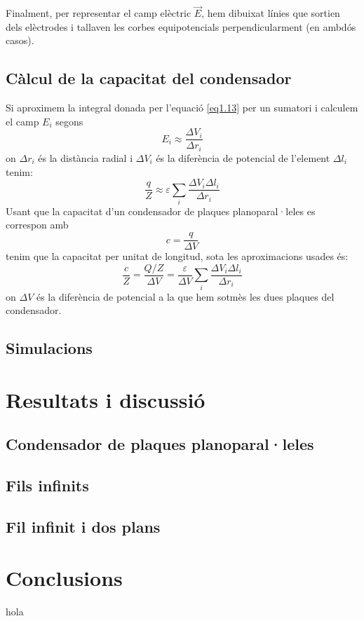 \documentclass[a4paper,10.5pt]{report}
\begin{document}
	Finalment, per representar el camp elèctric $\vec{E}$, hem dibuixat línies que sortien dels elèctrodes i tallaven les corbes equipotencials perpendicularment (en ambdós casos). 
	
	\subsection{Càlcul de la capacitat del condensador}
	Si aproximem la integral donada per l'equació \eqref{eq1.13} per un sumatori i calculem el camp $E_i$ segons
	\begin{equation}
		E_i \approx \frac{\Delta V_i}{\Delta r_i}
	\end{equation}
	on $\Delta r_i$ és la distància radial i $\Delta V_i$ és la diferència de potencial de l'element $\Delta l_i$ tenim:
	\begin{equation}
		\frac{q}{Z} \approx \varepsilon \sum_i \frac{\Delta V_i \Delta l_i}{\Delta r_i}
	\end{equation}
	Usant que la capacitat d'un condensador de plaques planoparal·leles es correspon amb 
	\begin{equation}
		c = \frac{q}{\Delta V}
	\end{equation}
	tenim que la capacitat per unitat de longitud, sota les aproximacions usades és:
	\begin{equation}
		\frac{c}{Z} = \frac{Q/Z}{\Delta V} = \frac{\varepsilon}{\Delta V} \sum_i \frac{\Delta V_i \Delta l_i}{\Delta r_i}  
	\end{equation}
	on $\Delta V$ és la diferència de potencial a la que hem sotmès les dues plaques del condensador.
	
	\subsection{Simulacions}
	\section{Resultats i discussió}
	
	\subsection{Condensador de plaques planoparal·leles}
	
	\subsection{Fils infinits}

	\subsection{Fil infinit i dos plans}
	
	\section{Conclusions}
	hola
\end{document}
